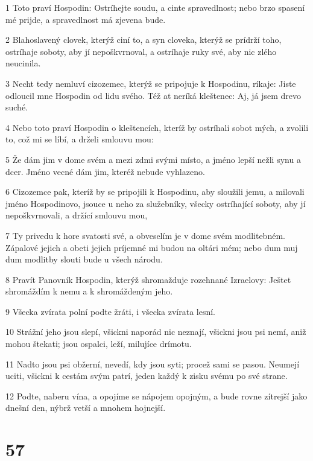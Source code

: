 \par 1 Toto praví Hospodin: Ostríhejte soudu, a cinte spravedlnost; nebo brzo spasení mé prijde, a spravedlnost má zjevena bude.
\par 2 Blahoslavený clovek, kterýž ciní to, a syn cloveka, kterýž se prídrží toho, ostríhaje soboty, aby jí nepoškvrnoval, a ostríhaje ruky své, aby nic zlého neucinila.
\par 3 Necht tedy nemluví cizozemec, kterýž se pripojuje k Hospodinu, ríkaje: Jiste odloucil mne Hospodin od lidu svého. Též at neríká kleštenec: Aj, já jsem drevo suché.
\par 4 Nebo toto praví Hospodin o kleštencích, kteríž by ostríhali sobot mých, a zvolili to, což mi se líbí, a drželi smlouvu mou:
\par 5 Že dám jim v dome svém a mezi zdmi svými místo, a jméno lepší nežli synu a dcer. Jméno vecné dám jim, kteréž nebude vyhlazeno.
\par 6 Cizozemce pak, kteríž by se pripojili k Hospodinu, aby sloužili jemu, a milovali jméno Hospodinovo, jsouce u neho za služebníky, všecky ostríhající soboty, aby jí nepoškvrnovali, a držící smlouvu mou,
\par 7 Ty privedu k hore svatosti své, a obveselím je v dome svém modlitebném. Zápalové jejich a obeti jejich príjemné mi budou na oltári mém; nebo dum muj dum modlitby slouti bude u všech národu.
\par 8 Pravít Panovník Hospodin, kterýž shromažduje rozehnané Izraelovy: Ještet shromáždím k nemu a k shromáždeným jeho.
\par 9 Všecka zvírata polní podte žráti, i všecka zvírata lesní.
\par 10 Strážní jeho jsou slepí, všickni naporád nic neznají, všickni jsou psi nemí, aniž mohou štekati; jsou ospalci, leží, milujíce drímotu.
\par 11 Nadto jsou psi obžerní, nevedí, kdy jsou syti; procež sami se pasou. Neumejí uciti, všickni k cestám svým patrí, jeden každý k zisku svému po své strane.
\par 12 Podte, naberu vína, a opojíme se nápojem opojným, a bude rovne zítrejší jako dnešní den, nýbrž vetší a mnohem hojnejší.

\chapter{57}

